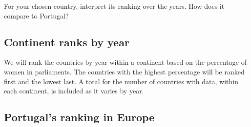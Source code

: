 \documentclass[a4paper,9pt,twocolumn,twoside,printwatermark=false]{pinp}
\begin{document}
For your chosen country, interpret its ranking over the years. How does
it compare to Portugal?

\subsection{Continent ranks by year}\label{continent-ranks-by-year}

We will rank the countries by year within a continent based on the
percentage of women in parliaments. The countries with the highest
percentage will be ranked first and the lowest last. A total for the
number of countries with data, within each continent, is included as it
varies by year.

\begin{Shaded}
\begin{Highlighting}[]
\NormalTok{cWP[}\OperatorTok{!}
    \DataTypeTok{:=}\NormalTok{(} \NormalTok{(}\OperatorTok{-}
\StringTok{ }\NormalTok{.(Continent, Year)]}
\end{Highlighting}
\end{Shaded}

\subsection{Portugal's ranking in
Europe}\label{portugals-ranking-in-europe}
\end{document}
